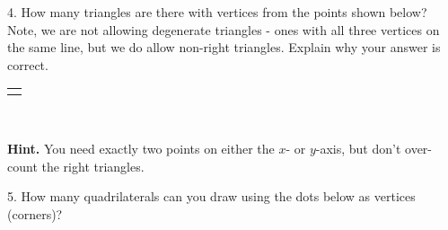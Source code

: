 \documentclass[10pt,]{book}
\theoremstyle{plain}
\theoremstyle{definition}
\theoremstyle{definition}
\theoremstyle{definition}
\theoremstyle{definition}
\numberwithin{equation}{chapter}
\newlength{\panelmax}
\begin{document}
\begin{exerciselist}
\begin{enumerate}[label=(\alph*)]
\end{enumerate}
%
\par\smallskip
\item[4.]\hypertarget{exercise-114}{}\hypertarget{p-943}{}%
How many triangles are there with vertices from the points shown below? Note, we are not allowing degenerate triangles - ones with all three vertices on the same line, but we do allow non-right triangles. Explain why your answer is correct.%
{%
\setlength{\panelmax}{0pt}
\ifdefined\panelboxAimage\else\newsavebox{\panelboxAimage}\fi%
\begin{lrbox}{\panelboxAimage}
\end{lrbox}
\ifdefined\phAimage\else\newlength{\phAimage}\fi%
\setlength{\phAimage}{\ht\panelboxAimage+\dp\panelboxAimage}
\settototalheight{\phAimage}{\usebox{\panelboxAimage}}
\setlength{\panelmax}{\maxof{\panelmax}{\phAimage}}
\leavevmode%
\setlength{\tabcolsep}{0\linewidth}
\par\medskip\noindent
\hspace*{0.25\linewidth}%
\begin{tabular}{@{}*{1}{c}@{}}
\begin{minipage}[c][\panelmax][t]{0.5\linewidth}\usebox{\panelboxAimage}\end{minipage}\end{tabular}\\
}%
\par\smallskip
\par\smallskip%
\noindent\textbf{Hint.}\hypertarget{hint-6}{}\quad%
\hypertarget{p-944}{}%
You need exactly two points on either the \(x\)- or \(y\)-axis, but don't over-count the right triangles.%
\item[5.]\hypertarget{exercise-115}{}\hypertarget{p-945}{}%
How many quadrilaterals can you draw using the dots below as vertices (corners)?%

\end{exerciselist}
\end{document}
